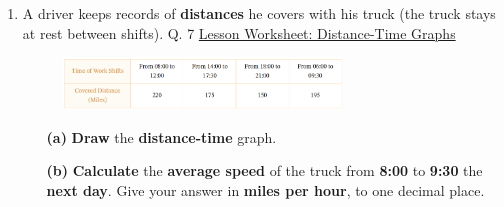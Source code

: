 \documentclass[A4,12pt]{article}
\begin{document}
\begin{enumerate}[label=\bfseries (\arabic*)]
\item A driver keeps records of \textbf{distances} he covers with his truck (the truck stays at rest between shifts). \cite{Nagwa} Q. 7 \href{https://www.nagwa.com/en/worksheets/932192593730/}{Lesson Worksheet: Distance-Time Graphs}
%
\begin{figure}[H]
    \centering
    \includegraphics[width=0.7\textwidth]{Nagwa_Q7_kin2.png}
\end{figure}
%
\begin{itemize}
    \item[\bf (a)] \textbf{Draw} the \textbf{distance-time} graph.

    \item[\bf (b)] \textbf{Calculate} the \textbf{average speed} of the truck from \textbf{8:00} to \textbf{9:30} the \textbf{next day}. Give your answer in \textbf{miles per hour}, to one decimal place.
\end{itemize}


















\end{enumerate}
\end{document}

